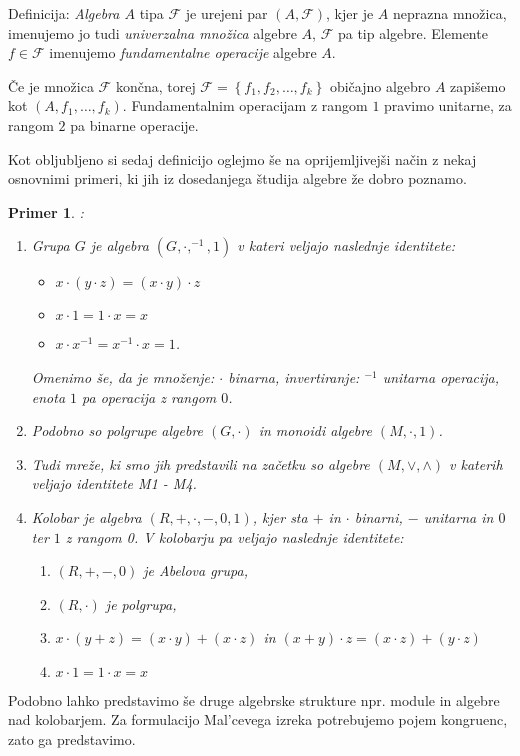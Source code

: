 \documentclass[a4paper,11pt]{article}
\newtheorem{primer}{Primer}
\begin{document}
Definicija: \emph{Algebra $A$} tipa $\mathcal{F}$ je urejeni par $\left(A, \mathcal{F}\right)$, kjer je $A$ neprazna 
množica, imenujemo jo tudi \emph{univerzalna množica} algebre $A$, $\mathcal{F}$ pa tip algebre. Elemente $f \in 
\mathcal{F}$ imenujemo \emph{fundamentalne operacije} algebre $A$. 

Če je množica $\mathcal{F}$ končna, torej $\mathcal{F} = \left\{f_1, f_2, \dots, f_k\right\}$ običajno algebro $A$ 
zapišemo kot $\left(A, f_1, \dots, f_k\right)$. Fundamentalnim operacijam z rangom $1$ pravimo unitarne, za rangom $2$ 
pa binarne operacije.

Kot obljubljeno si sedaj definicijo oglejmo še na oprijemljivejši način z nekaj osnovnimi primeri, ki jih iz dosedanjega
študija algebre že dobro poznamo.

\begin{primer}:
\begin{enumerate}
    \item Grupa $G$ je algebra $\left(G, \cdot, ^{-1}, 1\right)$ v kateri veljajo naslednje identitete:
    \begin{itemize}
        \item[G1] $x \cdot \left(y \cdot z\right) = \left(x \cdot y\right) \cdot z$
        \item[G2] $x \cdot 1 = 1 \cdot x = x$
        \item[G3] $x \cdot x^{-1} = x^{-1} \cdot x = 1$.
    \end{itemize} 
    Omenimo še, da je množenje: $\cdot$ binarna, invertiranje: $^{-1}$ unitarna operacija, enota $1$ pa operacija 
    z rangom $0$. 
    \item Podobno so polgrupe algebre $\left(G, \cdot\right)$ in monoidi algebre  $\left(M, \cdot, 1\right)$.
    \item Tudi mreže, ki smo jih predstavili na začetku so algebre $\left(M,\vee, \wedge\right)$ v katerih veljajo
    identitete M1 - M4. 
    \item Kolobar je algebra $\left(R, +, \cdot, -, 0, 1\right)$, kjer sta $+$ in $\cdot$ binarni, $-$ unitarna in $0$ 
    ter $1$ z rangom 0. V kolobarju pa veljajo naslednje identitete:
    \begin{enumerate}
        \item[R1] $\left(R, +, -, 0\right)$ je Abelova grupa,
        \item[R2] $\left(R, \cdot\right)$ je polgrupa, 
        \item[R3] $x \cdot \left(y + z\right) = \left(x \cdot y\right) + \left(x \cdot z\right)$ in
        $\left(x + y\right) \cdot z = \left(x \cdot z\right) + \left(y \cdot z\right)$
        \item[G2] $x \cdot 1 = 1 \cdot x = x$
    \end{enumerate}
\end{enumerate}
\end{primer}
Podobno lahko predstavimo še druge algebrske strukture npr. module in algebre nad kolobarjem.
Za formulacijo Mal'cevega izreka potrebujemo pojem kongruenc, zato ga predstavimo.
\end{document}
